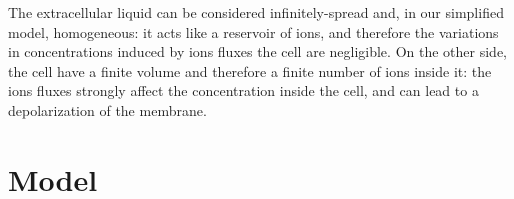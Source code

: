 \documentclass[11pt,a4 paper]{article}
\begin{document}
The extracellular liquid can be considered infinitely-spread and, in our simplified model, homogeneous: it acts like a reservoir of ions, and therefore the variations in concentrations induced by ions fluxes the cell are negligible. On the other side, the cell have a finite volume and therefore a finite number of ions inside it: the ions fluxes strongly affect the concentration inside the cell, and can lead to a depolarization of the membrane.

\section{Model}
\end{document}

